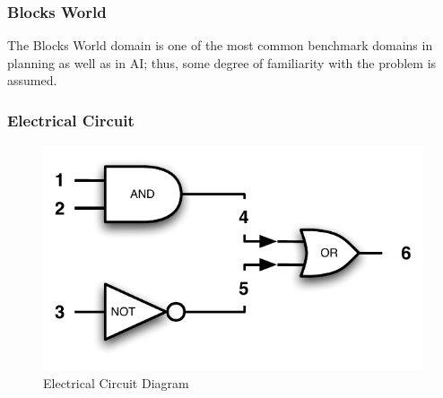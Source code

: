 \subsubsection{Blocks World}
The Blocks World domain is one of the most common benchmark domains in planning as well as in AI; thus, some degree of familiarity with the problem is assumed. 


\subsubsection{Electrical Circuit}
\begin{figure}[htbp]
    \centering
        \includegraphics[scale=.8]{../images/circuit.pdf}
    \caption{Electrical Circuit Diagram}
    \label{fig:circuit}
\end{figure}


